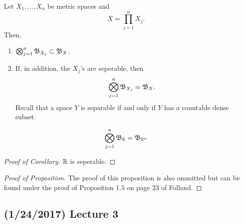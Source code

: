 \documentclass[11pt,leqno,oneside]{amsbook}
\numberwithin{thm}{section}
\begin{document}
\begin{prop}
  Let $X_1, \ldots, X_n$ be metric spaces and \[
    X = \prod_{j=1}^n X_j.
  \]
  Then,
  \begin{enumerate}
  \item $\bigotimes_{j=1}^n \mathfrak{B}_{X_j} \subset \mathfrak{B}_X$.
  \item If, in addition, the $X_j$'s are seperable, then \[
      \bigotimes_{j=1}^n \mathfrak{B}_{X_j} = \mathfrak{B}_X.
    \]
    Recall that a space $Y$ is separable if and only if $Y$ has a
    countable dense subset.
  \end{enumerate}
\end{prop}
\begin{cor}
  \[
    \bigotimes_{j=1}^n \mathfrak{B}_{\mathbb R} = \mathfrak{B}_{{\mathbb R}^n}
  \]
\end{cor}
\begin{proof}[Proof of Corollary]
  ${\mathbb R}$ is seperable.
\end{proof}
\begin{proof}[Proof of Proposition]
  The proof of this proposition is also ommitted but can be found
  under the proof of Proposition 1.5 on page 23 of Folland.
\end{proof}
\subsection*{(1/24/2017) Lecture 3}
\end{document}

